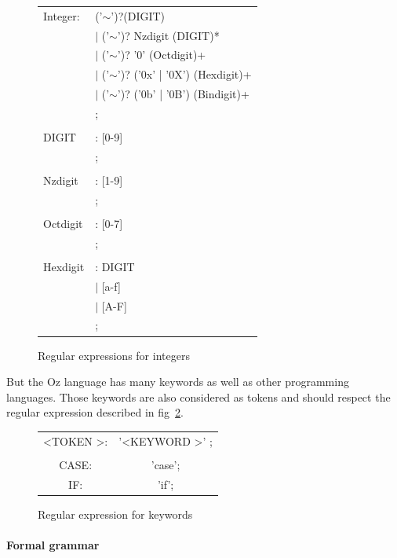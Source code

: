 \documentclass[11pt,a4paper,twoside,openright]{report}
\begin{document}
\begin{figure}[!ht]
 \centering
 \begin{tabular}{ll}
    Integer: & ('$\sim$')?(DIGIT)\\
    &$\vert$ ('$\sim$')? Nzdigit (DIGIT)*\\
    &$\vert$ ('$\sim$')? '0' (Octdigit)+\\
    &$\vert$ ('$\sim$')? ('0x' | '0X') (Hexdigit)+ \\
    &$\vert$ ('$\sim$')? ('0b' | '0B') (Bindigit)+\\
    &;\\
    &\\
    DIGIT&: [0-9]\\
    &;\\
    &\\
    Nzdigit &: [1-9]\\
    &;\\
    &\\
    Octdigit&: [0-7]\\
    &;\\
    &\\
    Hexdigit&: DIGIT \\
    &$\vert$ [a-f]\\
    &$\vert$ [A-F]\\
    &;
  \end{tabular}
  \caption{Regular expressions for integers}
  \label{fig:int_rule}
\end{figure}

But the Oz language has many keywords as well as other programming 
languages. Those keywords are also considered as tokens and should respect the 
regular expression described in fig~\ref{fig:keyword}.\\

\begin{figure}[!ht]
  \centering
  \begin{tabular}{cc}
    \textless TOKEN \textgreater: & '\textless KEYWORD \textgreater ' ;\\
    & \\
    CASE: & 'case'; \\
    IF: & 'if';
  \end{tabular}
  \caption{Regular expression for keywords}
  \label{fig:keyword}
\end{figure}

\paragraph{Formal grammar}
\end{document}
